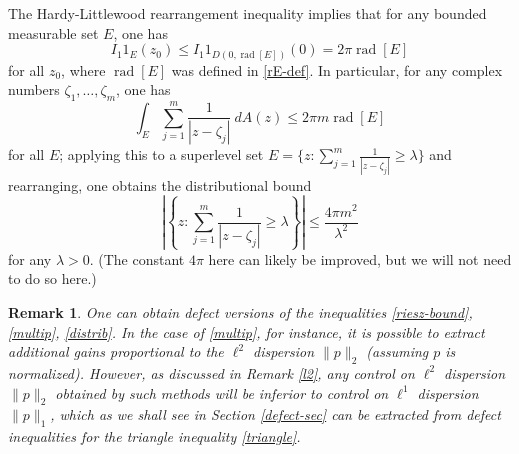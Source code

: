 \documentclass[12pt]{amsart}
\newtheorem{lemma}{Lemma}[section]
\newtheorem{remark}{Remark}[section]
\newcommand{\eps}{\varepsilon}
\renewcommand{\r}{\operatorname{rad}}
\renewcommand{\Re}{\operatorname{Re}}
\begin{document}
The Hardy-Littlewood rearrangement inequality \cite[Theorems 368--370, 378]{hl} implies that for any bounded measurable set $E$, one has
\begin{equation}\label{riesz-bound}
I_1 1_E(z_0) \leq I_1 1_{D(0, \r[E])}(0) = 2 \pi \r[E]
\end{equation}
for all $z_0$, where $\r[E]$ was defined in \eqref{rE-def}.  In particular, for any complex numbers $\zeta_1,\dots,\zeta_m$, one has
\begin{equation}\label{multip}
     \int_E \sum_{j=1}^m \frac{1}{|z-\zeta_j|}\ dA(z) \leq 2 \pi m \r[E]
\end{equation}
for all $E$; applying this to a superlevel set $E = \{ z:\sum_{j=1}^m \frac{1}{|z-\zeta_j|} \geq \lambda \}$ and rearranging, one obtains the distributional bound
\begin{equation}\label{distrib}
 \left|\left\{ z :\sum_{j=1}^m \frac{1}{|z-\zeta_j|} \geq \lambda \right\}\right| \leq \frac{4\pi m^2}{\lambda^2}
\end{equation}
for any $\lambda>0$.  (The constant $4\pi$ here can likely be improved, but we will not need to do so here.)

\begin{remark}  One can obtain defect versions of the inequalities \eqref{riesz-bound}, \eqref{multip}, \eqref{distrib}.  In the case of \eqref{multip}, for instance, it is possible to extract additional gains proportional to the $\ell^2$ dispersion $\|p\|_2$ (assuming $p$ is normalized).  However, as discussed in Remark \ref{l2}, any control on $\ell^2$ dispersion $\|p\|_2$ obtained by such methods will be inferior to control on $\ell^1$ dispersion $\|p\|_1$, which as we shall see in Section \ref{defect-sec} can be extracted from defect inequalities for the triangle inequality \eqref{triangle}.
\end{remark}


\end{document}

